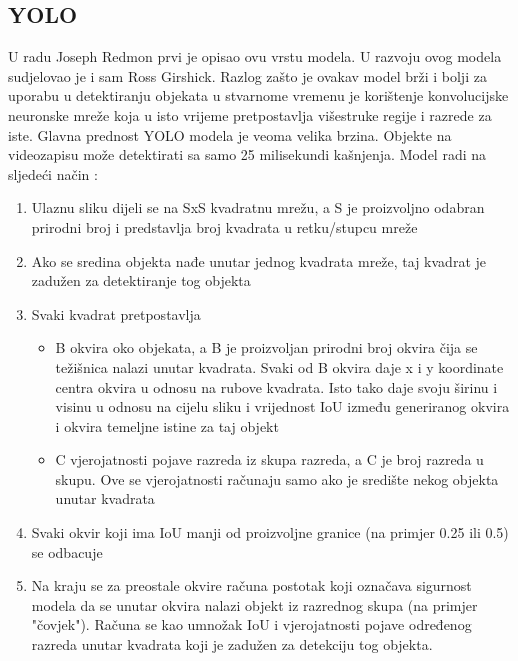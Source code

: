 \subsection{YOLO}
U radu \citep{DBLP:journals/corr/RedmonDGF15} Joseph Redmon prvi je opisao ovu vrstu modela.\newline
U razvoju ovog modela sudjelovao je i sam Ross Girshick. 
Razlog zašto je ovakav model brži i bolji za uporabu u detektiranju objekata u stvarnome vremenu je korištenje konvolucijske neuronske
mreže koja u isto vrijeme pretpostavlja višestruke regije i razrede za iste. Glavna prednost YOLO modela je veoma velika brzina. Objekte na videozapisu može detektirati sa samo 25 milisekundi kašnjenja.\newline
Model radi na sljedeći način \citep{DBLP:journals/corr/RedmonDGF15}:\newline
\begin{enumerate}
    \item Ulaznu sliku dijeli se na SxS kvadratnu mrežu, a S je proizvoljno odabran prirodni broj i predstavlja broj kvadrata u retku/stupcu mreže
    \item Ako se sredina objekta nađe unutar jednog kvadrata mreže, taj kvadrat je zadužen za detektiranje tog objekta
    \item Svaki kvadrat pretpostavlja
     \begin{itemize}
         \item  B okvira oko objekata, a B je proizvoljan prirodni broj okvira čija se težišnica nalazi unutar kvadrata.
          Svaki od B okvira daje x i y koordinate centra okvira u odnosu na rubove kvadrata. Isto tako daje svoju širinu i 
          visinu u odnosu na cijelu sliku i vrijednost IoU između generiranog okvira i okvira temeljne istine za taj objekt
         \item  C vjerojatnosti pojave razreda iz skupa razreda, a C je broj razreda u skupu. Ove se vjerojatnosti računaju 
         samo ako je središte nekog objekta unutar kvadrata
    \end{itemize}
    \item Svaki okvir koji ima IoU manji od proizvoljne granice (na primjer 0.25 ili 0.5) se odbacuje
    \item Na kraju se za preostale okvire računa postotak koji označava sigurnost modela da se unutar okvira nalazi objekt iz razrednog skupa (na primjer "čovjek").
    Računa se kao umnožak IoU i vjerojatnosti pojave određenog razreda unutar kvadrata koji je zadužen za detekciju tog objekta.
\end{enumerate}
